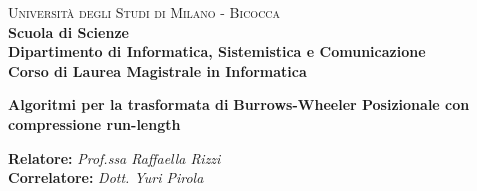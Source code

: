 \documentclass[a4paper,12pt, oneside]{book}
\begin{document}
{} 
\begin{titlepage}
  

  \noindent
  \begin{minipage}[t]{0.19\textwidth}
  \end{minipage}
  \begin{minipage}[t]{0.81\textwidth}
    {
      {\textsc{Università degli Studi di Milano - Bicocca}} \\
      \textbf{Scuola di Scienze} \\
      \textbf{Dipartimento di Informatica, Sistemistica e Comunicazione} \\
      \textbf{Corso di Laurea Magistrale in Informatica} \\
      \par
    }
  \end{minipage}
  
  \vspace{40mm}
  
  \begin{center}
    {\LARGE{
        \textbf{Algoritmi per la trasformata di}}}
    \vspace{1mm}
    {\LARGE{
        \textbf{Burrows-Wheeler Posizionale con}}}
    \vspace{1mm}
    {\LARGE{
        \textbf{compressione run-length}}}
    
  \end{center}
  
  \vspace{48mm}

  \noindent
  {\large \textbf{Relatore:} \textit{Prof.ssa Raffaella Rizzi}} \\

  \noindent
  {\large \textbf{Correlatore:} \textit{Dott. Yuri Pirola}}
  

\end{titlepage}
\end{document}

